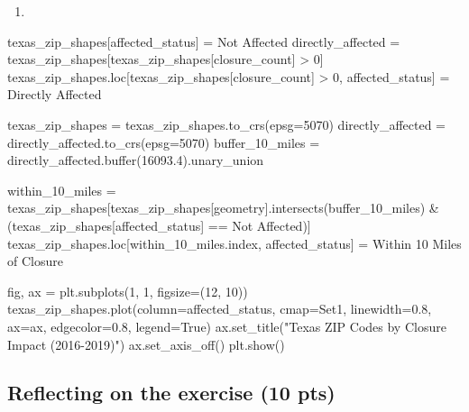 \documentclass[
  letterpaper,
  DIV=11,
  numbers=noendperiod]{scrartcl}
\newenvironment{Shaded}{\begin{snugshade}}{\end{snugshade}}
\newcommand{\NormalTok}[1]{\textcolor[rgb]{0.00,0.23,0.31}{#1}}
\providecommand{\tightlist}{%
  \setlength{\itemsep}{0pt}\setlength{\parskip}{0pt}}\usepackage{longtable,booktabs,array}
\begin{document}
\begin{enumerate}
\def\labelenumi{\arabic{enumi}.}
\setcounter{enumi}{3}
\tightlist
\item
\end{enumerate}

\begin{Shaded}
\begin{Highlighting}[]
\NormalTok{texas\_zip\_shapes[\textquotesingle{}affected\_status\textquotesingle{}] = \textquotesingle{}Not Affected\textquotesingle{} }
\NormalTok{directly\_affected = texas\_zip\_shapes[texas\_zip\_shapes[\textquotesingle{}closure\_count\textquotesingle{}] \textgreater{} 0]}
\NormalTok{texas\_zip\_shapes.loc[texas\_zip\_shapes[\textquotesingle{}closure\_count\textquotesingle{}] \textgreater{} 0, \textquotesingle{}affected\_status\textquotesingle{}] = \textquotesingle{}Directly Affected\textquotesingle{}}

\NormalTok{texas\_zip\_shapes = texas\_zip\_shapes.to\_crs(epsg=5070)}
\NormalTok{directly\_affected = directly\_affected.to\_crs(epsg=5070)}
\NormalTok{buffer\_10\_miles = directly\_affected.buffer(16093.4).unary\_union }

\NormalTok{within\_10\_miles = texas\_zip\_shapes[texas\_zip\_shapes[\textquotesingle{}geometry\textquotesingle{}].intersects(buffer\_10\_miles) \& (texas\_zip\_shapes[\textquotesingle{}affected\_status\textquotesingle{}] == \textquotesingle{}Not Affected\textquotesingle{})]}
\NormalTok{texas\_zip\_shapes.loc[within\_10\_miles.index, \textquotesingle{}affected\_status\textquotesingle{}] = \textquotesingle{}Within 10 Miles of Closure\textquotesingle{}}

\NormalTok{fig, ax = plt.subplots(1, 1, figsize=(12, 10))}
\NormalTok{texas\_zip\_shapes.plot(column=\textquotesingle{}affected\_status\textquotesingle{}, cmap=\textquotesingle{}Set1\textquotesingle{}, linewidth=0.8, ax=ax, edgecolor=\textquotesingle{}0.8\textquotesingle{}, legend=True)}
\NormalTok{ax.set\_title("Texas ZIP Codes by Closure Impact (2016{-}2019)")}
\NormalTok{ax.set\_axis\_off()}
\NormalTok{plt.show()}
\end{Highlighting}
\end{Shaded}

\subsection{Reflecting on the exercise (10
pts)}\label{reflecting-on-the-exercise-10-pts}
\end{document}
